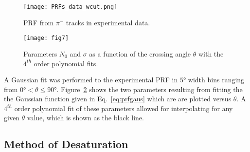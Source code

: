 \begin{figure}[!htb]
     \centering
	 \texttt{[image: PRFs\_data\_wcut.png]}
     \caption{PRF from $\pi^-$ tracks in experimental data. }
     \label{fig:prfpimData}
\end{figure}

\begin{figure}[ht!]
\vspace{5mm}
\texttt{[image: fig7]}
\caption{Parameters $N_{0}$ and $\sigma$ as a function of the crossing angle $\theta$ with the $4^{th}$ order polynomial fits.}
\label{fig:normsigma}
\end{figure}

\begin{comment}
\begin{table}
\centering
 \begin{tabular}{||c c c c c c||} 
 \hline
 Coefficient & $c_0$ & $c_1$ & $c_2$ & $c_3$ & $c_4$ \\ [0.5ex] 
 \hline\hline
 $0 < \theta < 45$ & & & & &  \\ [.25ex]
 \hline
 $N_0$ & .897 & 5.766E-3 & -4.263E-4 & 7.444E-6 & 5.705E-8 \\ 
 \hline
 $\sigma$ & 5.496 & -3.920E-2 & 2.693E-3 & -5.208E-5 & 5.334E-7\\
 \hline
 $45 < \theta < 90$ & & & &  & \\ [.25ex]
 \hline	
 $N_0$ & 1.220 & -6.258E-2 & 1.608E-3 & -1.492E-5  & 4.654E-8 \\
 \hline
 $\sigma$ & 31.368 & -1.109 & 1.779E-2 & -1.336E-4 & 3.940E-7\\
 \hline
\end{tabular}
\caption{Coefficients of the $4_th$ order polynomial fit to the Gaussian parameters $N_0$ and $\sigma$. The polynomial form is given as $c_0 + c_1 x + c_2 x^2 + c_3 x^3 + c_4 x^4$}
\label{tb:coeff}
\end{table}
\end{comment}
 
A Gaussian fit was performed to the experimental PRF in $\ang{5}$ width bins ranging from $\ang{0} < \theta \leq \ang{90}$. Figure~\ref{fig:normsigma} shows the two parameters resulting from fitting the the Gaussian function given in Eq.~\ref{eq:prfgaus} which are are plotted versus $\theta$. A $4^{th}$ order polynomial fit of these parameters allowed for interpolating for any given $\theta$ value, which is shown as the black line. 


\subsection{Method of Desaturation}
\label{sec:desat}

